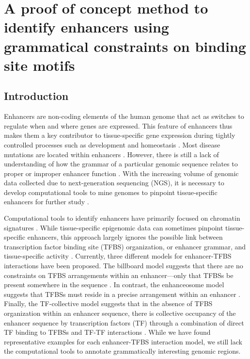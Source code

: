 \chapter{A proof of concept method to identify enhancers using grammatical constraints on binding site motifs}
\label{chap:Proof of concept method to identify enhancers}

\section{Introduction}

Enhancers are non-coding elements of the human genome that act as switches to regulate when and where genes are expressed. This feature of enhancers thus makes them a key contributor to tissue-specific gene expression during tightly controlled processes such as development and homeostasis \cite{levine2010,heinz2010,small1992,spitz2012,liu2012a,swanson2010a}. Most disease mutations are located within enhancers \cite{maurano2012,tak2015a,visel2009}. However, there is still a lack of understanding of how the grammar of a particular genomic sequence relates to proper or improper enhancer function \cite{jindal2021}. With the increasing volume of genomic data collected due to next-generation sequencing (NGS), it is necessary to develop computational tools to mine genomes to pinpoint tissue-specific enhancers for further study \cite{leonelli2019,marx2013,pal2020,stephens2015}. 

Computational tools to identify enhancers have primarily focused on chromatin signatures \cite{meuleman2020,zinzen2009}. While tissue-specific epigenomic data can sometimes pinpoint tissue-specific enhancers, this approach largely ignores the possible link between transcription factor binding site (TFBS) organization, or enhancer grammar, and tissue-specific activity \cite{jindal2021,grossman2017,ryan2020,king2020a,halfon2019}. Currently, three different models for enhancer-TFBS interactions have been proposed. The billboard model suggests that there are no constraints on TFBS arrangements within an enhancer—only that TFBSs be present somewhere in the sequence \cite{liu2012a,kulkarni2003,jindal2021}. In contrast, the enhanceosome model suggests that TFBSs must reside in a precise arrangement within an enhancer \cite{bazett-jones1994,thanos1995,panne2007,melnikov2012,jindal2021}. Finally, the TF-collective model suggests that in the absence of TFBS organization within an enhancer sequence, there is collective occupancy of the enhancer sequence by transcription factors (TF) through a combination of direct TF binding to TFBSs and TF-TF interactions \cite{junion2012,jindal2021}. While we have found representative examples for each enhancer-TFBS interaction model, we still lack the computational tools to annotate grammatically interesting genomic regions. 

